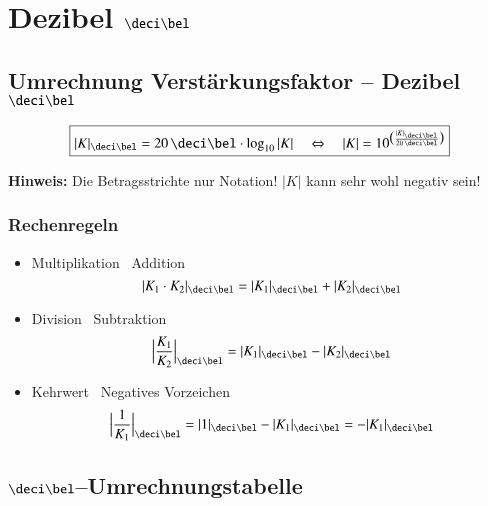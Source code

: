 \section{Dezibel $\deci \bel$}


\subsection{Umrechnung Verstärkungsfaktor -- Dezibel $\deci \bel$}

$$ \boxed{ |K|_{\deci \bel} = 20 \, \deci \bel \cdot \log_{10} |K| \quad \Leftrightarrow \quad 
            |K| = 10 ^{\big( \frac{|K|_{\deci \bel}}{20 \, \deci \bel}\big)}  } $$

\textbf{Hinweis:} Die Betragsstrichte nur Notation! $|K|$ kann sehr wohl negativ sein!


\subsubsection{Rechenregeln}

\begin{itemize}
    \item Multiplikation \textrightarrow\ Addition 
        $$ | K_1 \cdot K_2 |_{\deci \bel} = | K_1 |_{\deci \bel} + | K_2 |_{\deci \bel} $$
    \item Division \textrightarrow\ Subtraktion 
        $$ \Big| \frac{K_1}{K_2} \Big|_{\deci \bel} = | K_1 |_{\deci \bel} - | K_2 |_{\deci \bel} $$
    \item Kehrwert \textrightarrow\ Negatives Vorzeichen 
        $$ \Big| \frac{1}{K_1} \Big|_{\deci \bel} = | 1 |_{\deci \bel} - | K_1 |_{\deci \bel} = - | K_1 |_{\deci \bel} $$
\end{itemize}


\subsection{$\deci \bel$--Umrechnungstabelle}

